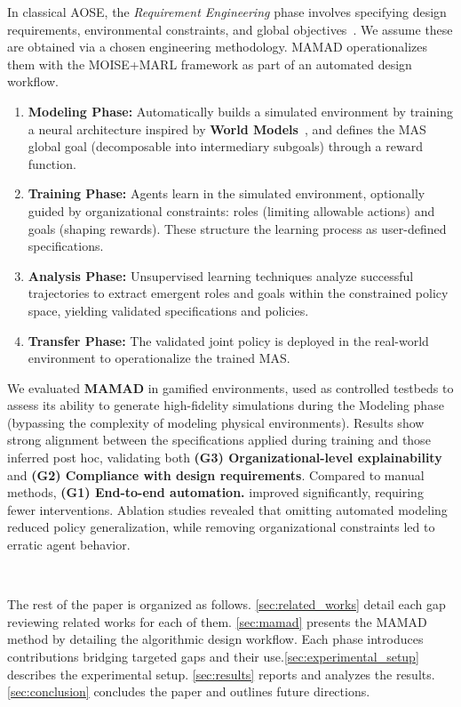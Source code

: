 \documentclass[pdflatex,sn-mathphys-num]{sn-jnl}%
\theoremstyle{thmstyleone}%
\theoremstyle{thmstyletwo}%
\theoremstyle{thmstylethree}%
\begin{document}
In classical AOSE, the \textit{Requirement Engineering} phase involves specifying design requirements, environmental constraints, and global objectives~\cite{Pavon2003, Bernon2005}. We assume these are obtained via a chosen engineering methodology. MAMAD operationalizes them with the MOISE+MARL framework as part of an automated design workflow.

\begin{enumerate}
    \item \textbf{Modeling Phase:} Automatically builds a simulated environment by training a neural architecture inspired by \textbf{World Models}~\cite{Ha2018}, and defines the MAS global goal (decomposable into intermediary subgoals) through a reward function.
    \item \textbf{Training Phase:} Agents learn in the simulated environment, optionally guided by organizational constraints: roles (limiting allowable actions) and goals (shaping rewards). These structure the learning process as user-defined specifications.
    \item \textbf{Analysis Phase:} Unsupervised learning techniques analyze successful trajectories to extract emergent roles and goals within the constrained policy space, yielding validated specifications and policies.
    \item \textbf{Transfer Phase:} The validated joint policy is deployed in the real-world environment to operationalize the trained MAS.
\end{enumerate}

We evaluated \textbf{MAMAD} in gamified environments, used as controlled testbeds to assess its ability to generate high-fidelity simulations during the Modeling phase (bypassing the complexity of modeling physical environments). Results show strong alignment between the specifications applied during training and those inferred post hoc, validating both \textbf{(G3) Organizational-level explainability} and \textbf{(G2) Compliance with design requirements}. Compared to manual methods, \textbf{(G1) End-to-end automation.} improved significantly, requiring fewer interventions. Ablation studies revealed that omitting automated modeling reduced policy generalization, while removing organizational constraints led to erratic agent behavior.

\

The rest of the paper is organized as follows. \autoref{sec:related_works} detail each gap reviewing related works for each of them. \autoref{sec:mamad} presents the MAMAD method by detailing the algorithmic design workflow. Each phase introduces contributions bridging targeted gaps and their use.\autoref{sec:experimental_setup} describes the experimental setup. \autoref{sec:results} reports and analyzes the results. \autoref{sec:conclusion} concludes the paper and outlines future directions.
\end{document}

